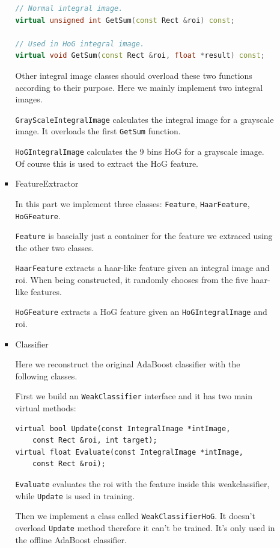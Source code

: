 \documentclass[a4paper]{article}
\begin{document}
\begin{enumerate}
\begin{itemize}
\begin{itemize}
\begin{lstlisting}[language=C++]
// Normal integral image.
virtual unsigned int GetSum(const Rect &roi) const;

// Used in HoG integral image.
virtual void GetSum(const Rect &roi, float *result) const;
\end{lstlisting}

Other integral image classes should overload these two functions according to their purpose. Here we mainly implement two integral images.

\lstinline{GrayScaleIntegralImage} calculates the integral image for a grayscale image. It overloads the first \lstinline{GetSum} function.

\lstinline{HoGIntegralImage} calculates the 9 bins HoG for a grayscale image. Of course this is used to extract the HoG feature.

\item FeatureExtractor

In this part we implement three classes: \lstinline{Feature}, \lstinline{HaarFeature}, \lstinline{HoGFeature}.

\lstinline{Feature} is bascially just a container for the feature we extraced using the other two classes.

\lstinline{HaarFeature} extracts a haar-like feature given an integral image and roi. When being constructed, it randomly chooses from the five haar-like features.

\lstinline{HoGFeature} extracts a HoG feature given an \lstinline{HoGIntegralImage} and roi.

\item Classifier

Here we reconstruct the original AdaBoost classifier with the following classes.

First we build an \lstinline{WeakClassifier} interface and it has two main virtual methods:

\begin{lstlisting}
virtual bool Update(const IntegralImage *intImage, 
	const Rect &roi, int target);
virtual float Evaluate(const IntegralImage *intImage, 
	const Rect &roi);
\end{lstlisting}

\lstinline{Evaluate} evaluates the roi with the feature inside this weakclassifier, while \lstinline{Update} is used in training.

Then we implement a class called \lstinline{WeakClassifierHoG}. It doesn't overload \lstinline{Update} method therefore it can't be trained. It's only used in the offline AdaBoost classifier.


\end{itemize}
\end{itemize}
\end{enumerate}
\end{document}
